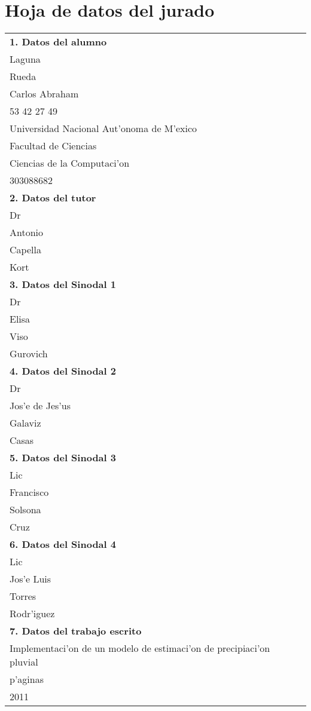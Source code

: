 
\section*{Hoja de datos del jurado}

\small{\begin{center}
\begin{tabular}{|l|}

  \hline 
  \textbf{ 1. Datos del alumno}\\ Laguna \\Rueda\\Carlos Abraham\\53 42 27 49\\
  Universidad Nacional Aut'onoma de M'exico\\Facultad de Ciencias\\Ciencias de la Computaci'on\\
  303088682  \tabularnewline
  \hline
  \textbf{2. Datos del tutor}\\ Dr\\ Antonio\\Capella\\Kort\tabularnewline
  \hline    
  \textbf{3. Datos del Sinodal 1}\\ Dr\\ Elisa\\Viso\\Gurovich\tabularnewline
  \hline 

  \textbf{4. Datos del Sinodal 2}\\ Dr\\ Jos'e de Jes'us\\Galaviz\\Casas\tabularnewline
  \hline 
  \textbf{5. Datos del Sinodal 3}\\Lic\\ Francisco\\Solsona\\Cruz \tabularnewline
  \hline 
  \textbf{6. Datos del Sinodal 4}\\ Lic\\ Jos'e Luis\\Torres\\Rodr'iguez\tabularnewline
  \hline
  \textbf{7. Datos del trabajo escrito}\\
  Implementaci'on de un modelo de estimaci'on de precipiaci'on pluvial \\
   \pageref{LastPage} p'aginas\\2011\tabularnewline
  \hline
\end{tabular}
\end{center}
}
